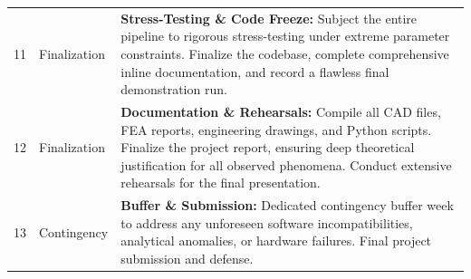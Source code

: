 \begin{longtable}{p{1.5cm} p{2.5cm} p{10cm}}
        11 & Finalization & \textbf{Stress-Testing \& Code Freeze:} Subject the entire pipeline to rigorous stress-testing under extreme parameter constraints. Finalize the codebase, complete comprehensive inline documentation, and record a flawless final demonstration run. \\
        12 & Finalization & \textbf{Documentation \& Rehearsals:} Compile all CAD files, FEA reports, engineering drawings, and Python scripts. Finalize the project report, ensuring deep theoretical justification for all observed phenomena. Conduct extensive rehearsals for the final presentation. \\
        13 & Contingency & \textbf{Buffer \& Submission:} Dedicated contingency buffer week to address any unforeseen software incompatibilities, analytical anomalies, or hardware failures. Final project submission and defense. \\
\end{longtable}

